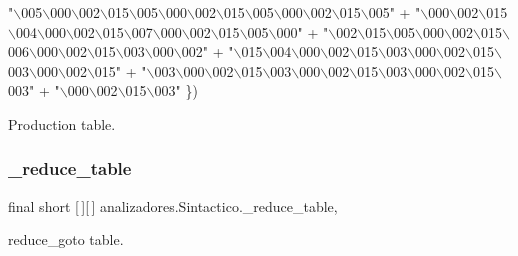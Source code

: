 \begin{DoxyCode}
    \textcolor{stringliteral}{"\(\backslash\)005\(\backslash\)000\(\backslash\)002\(\backslash\)015\(\backslash\)005\(\backslash\)000\(\backslash\)002\(\backslash\)015\(\backslash\)005\(\backslash\)000\(\backslash\)002\(\backslash\)015\(\backslash\)005"} +
    \textcolor{stringliteral}{"\(\backslash\)000\(\backslash\)002\(\backslash\)015\(\backslash\)004\(\backslash\)000\(\backslash\)002\(\backslash\)015\(\backslash\)007\(\backslash\)000\(\backslash\)002\(\backslash\)015\(\backslash\)005\(\backslash\)000"} +
    \textcolor{stringliteral}{"\(\backslash\)002\(\backslash\)015\(\backslash\)005\(\backslash\)000\(\backslash\)002\(\backslash\)015\(\backslash\)006\(\backslash\)000\(\backslash\)002\(\backslash\)015\(\backslash\)003\(\backslash\)000\(\backslash\)002"} +
    \textcolor{stringliteral}{"\(\backslash\)015\(\backslash\)004\(\backslash\)000\(\backslash\)002\(\backslash\)015\(\backslash\)003\(\backslash\)000\(\backslash\)002\(\backslash\)015\(\backslash\)003\(\backslash\)000\(\backslash\)002\(\backslash\)015"} +
    \textcolor{stringliteral}{"\(\backslash\)003\(\backslash\)000\(\backslash\)002\(\backslash\)015\(\backslash\)003\(\backslash\)000\(\backslash\)002\(\backslash\)015\(\backslash\)003\(\backslash\)000\(\backslash\)002\(\backslash\)015\(\backslash\)003"} +
    \textcolor{stringliteral}{"\(\backslash\)000\(\backslash\)002\(\backslash\)015\(\backslash\)003"} \})
\end{DoxyCode}
Production table. \mbox{\label{classanalizadores_1_1_sintactico_a96c2098df27363aea8d9d18a9c4fa469}} 
\subsubsection{\texorpdfstring{\+\_\+reduce\+\_\+table}{\_reduce\_table}}
{\footnotesize\ttfamily final short \mbox{[}$\,$\mbox{]}\mbox{[}$\,$\mbox{]} analizadores.\+Sintactico.\+\_\+reduce\+\_\+table\hspace{0.3cm}{\ttfamily [static]}, {\ttfamily [protected]}}

{\ttfamily reduce\+\_\+goto} table. \mbox{\label{classanalizadores_1_1_sintactico_a7e14d36a24d6ed982b06e2b9ac181c4f}} 
